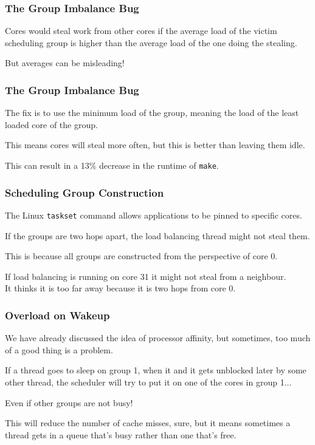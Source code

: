 \begin{frame}
\frametitle{The Group Imbalance Bug}

Cores would steal work from other cores if the average load of the victim scheduling group is higher than the average load of the one doing the stealing. 

But averages can be misleading! 

\end{frame}



\begin{frame}
\frametitle{The Group Imbalance Bug}

The fix is to use the minimum load of the group, meaning the load of the least loaded core of the group. 

This means cores will steal more often, but this is better than leaving them idle. 

This can result in a 13\% decrease in the runtime of \texttt{make}.

\end{frame}



\begin{frame}
\frametitle{Scheduling Group Construction}

The Linux \texttt{taskset} command allows applications to be pinned to specific cores. 

If the groups are two hops apart, the load balancing thread might not steal them. 

This is because all groups are constructed from the perspective of core 0. 

If load balancing is running on core 31 it might not steal from a neighbour.\\
\quad It thinks it is too far away because it is two hops from core 0.

\end{frame}



\begin{frame}
\frametitle{Overload on Wakeup}

We have already discussed the idea of processor affinity, but sometimes, too much of a good thing is a problem. 

If a thread goes to sleep on group 1, when it and it gets unblocked later by some other thread, the scheduler will try to put it on one of the cores in group 1... 

Even if other groups are not busy! 

This will reduce the number of cache misses, sure, but it means sometimes a thread gets in a queue that's busy rather than one that's free.

\end{frame}




